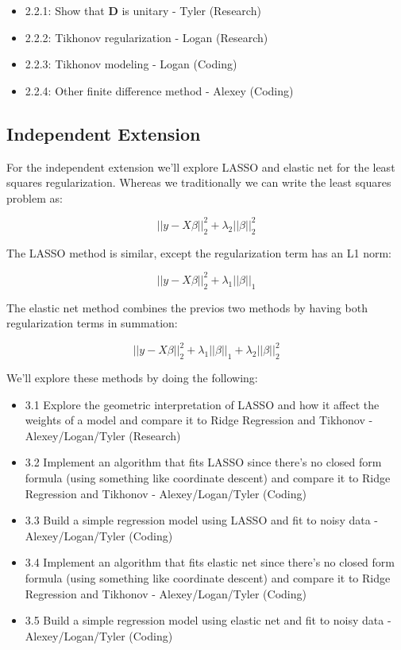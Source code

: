 \documentclass{article}
\begin{document}
    \begin{itemize}
        \item 2.2.1: Show that $\textbf{D}$ is unitary - Tyler (Research)
        \item 2.2.2: Tikhonov regularization - Logan (Research)
        \item 2.2.3: Tikhonov modeling - Logan (Coding)
        \item 2.2.4: Other finite difference method - Alexey (Coding)
    \end{itemize}

    \subsection{Independent Extension}

    For the independent extension we'll explore LASSO and elastic net for the least squares regularization. Whereas we traditionally we can write the least squares problem as:

    \begin{equation*}
        ||y-X\beta||^{2}_{2} + \lambda_2 ||\beta||_{2}^{2}
    \end{equation*}

    The LASSO method is similar, except the regularization term has an L1 norm:

    \begin{equation*}
        ||y-X\beta||^{2}_{2} + \lambda_1 ||\beta||_{1}
    \end{equation*}

    The elastic net method combines the previos two methods by having both regularization terms in summation:

    \begin{equation*}
        ||y-X\beta||^{2}_{2} + \lambda_1 ||\beta||_{1} + \lambda_2 ||\beta||_{2}^{2}
    \end{equation*}

    We'll explore these methods by doing the following:

    \begin{itemize}
        \item 3.1 Explore the geometric interpretation of LASSO and how it affect the weights of a model and compare it to Ridge Regression and Tikhonov - Alexey/Logan/Tyler (Research)
        \item 3.2 Implement an algorithm that fits LASSO since there's no closed form formula (using something like coordinate descent) and compare it to Ridge Regression and Tikhonov - Alexey/Logan/Tyler (Coding)
        \item 3.3 Build a simple regression model using LASSO and fit to noisy data  - Alexey/Logan/Tyler (Coding)
        \item 3.4 Implement an algorithm that fits elastic net since there's no closed form formula (using something like coordinate descent) and compare it to Ridge Regression and Tikhonov - Alexey/Logan/Tyler (Coding)
        \item 3.5 Build a simple regression model using elastic net and fit to noisy data  - Alexey/Logan/Tyler (Coding)
    \end{itemize}
\end{document}
